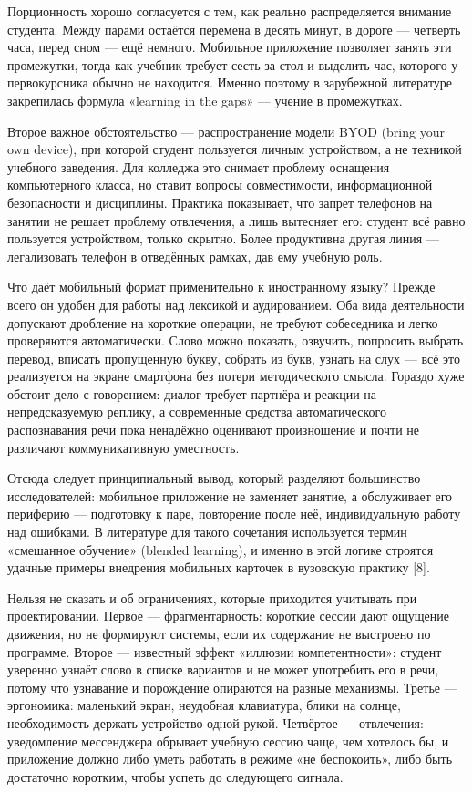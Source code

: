\documentclass[11pt,a4paper,openany]{report}
\begin{document}
Порционность хорошо согласуется с тем, как реально распределяется внимание студента. Между парами остаётся перемена в десять минут, в дороге — четверть часа, перед сном — ещё немного. Мобильное приложение позволяет занять эти промежутки, тогда как учебник требует сесть за стол и выделить час, которого у первокурсника обычно не находится. Именно поэтому в зарубежной литературе закрепилась формула «learning in the gaps» — учение в промежутках.

Второе важное обстоятельство — распространение модели BYOD (bring your own device), при которой студент пользуется личным устройством, а не техникой учебного заведения. Для колледжа это снимает проблему оснащения компьютерного класса, но ставит вопросы совместимости, информационной безопасности и дисциплины. Практика показывает, что запрет телефонов на занятии не решает проблему отвлечения, а лишь вытесняет его: студент всё равно пользуется устройством, только скрытно. Более продуктивна другая линия — легализовать телефон в отведённых рамках, дав ему учебную роль.

Что даёт мобильный формат применительно к иностранному языку? Прежде всего он удобен для работы над лексикой и аудированием. Оба вида деятельности допускают дробление на короткие операции, не требуют собеседника и легко проверяются автоматически. Слово можно показать, озвучить, попросить выбрать перевод, вписать пропущенную букву, собрать из букв, узнать на слух — всё это реализуется на экране смартфона без потери методического смысла. Гораздо хуже обстоит дело с говорением: диалог требует партнёра и реакции на непредсказуемую реплику, а современные средства автоматического распознавания речи пока ненадёжно оценивают произношение и почти не различают коммуникативную уместность.

Отсюда следует принципиальный вывод, который разделяют большинство исследователей: мобильное приложение не заменяет занятие, а обслуживает его периферию — подготовку к паре, повторение после неё, индивидуальную работу над ошибками. В литературе для такого сочетания используется термин «смешанное обучение» (blended learning), и именно в этой логике строятся удачные примеры внедрения мобильных карточек в вузовскую практику [8].

Нельзя не сказать и об ограничениях, которые приходится учитывать при проектировании. Первое — фрагментарность: короткие сессии дают ощущение движения, но не формируют системы, если их содержание не выстроено по программе. Второе — известный эффект «иллюзии компетентности»: студент уверенно узнаёт слово в списке вариантов и не может употребить его в речи, потому что узнавание и порождение опираются на разные механизмы. Третье — эргономика: маленький экран, неудобная клавиатура, блики на солнце, необходимость держать устройство одной рукой. Четвёртое — отвлечения: уведомление мессенджера обрывает учебную сессию чаще, чем хотелось бы, и приложение должно либо уметь работать в режиме «не беспокоить», либо быть достаточно коротким, чтобы успеть до следующего сигнала.
\end{document}
